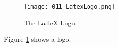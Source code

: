 \documentclass{article}
\begin{document}
\begin{figure}
  \texttt{[image: 011-LatexLogo.png]}
  \caption{The LaTeX Logo.}
  \label{fig:logo1}
\end{figure}

Figure \ref{fig:logo1} shows a logo.
\end{document}
